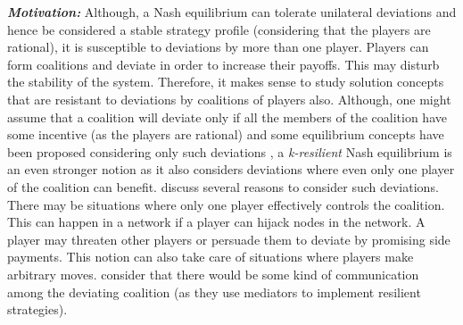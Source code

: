 \textit{\textbf{Motivation:}} Although, a Nash equilibrium can tolerate unilateral deviations and hence be considered a stable strategy profile (considering that the players are rational), it is susceptible to deviations by more than one player. Players can form coalitions and deviate in order to increase their payoffs. This may disturb the stability of the system. Therefore, it makes sense to study solution concepts that are resistant to deviations by coalitions of players also. Although, one might assume that a coalition will deviate only if all the members of the coalition have some incentive (as the players are rational) and some equilibrium concepts have been proposed considering only such deviations \cite{Aumann-59,Bernheim-1987,Moreno-1996}, a \textit{k-resilient} Nash equilibrium is an even stronger notion as it also considers deviations where even only one player of the coalition can benefit. \citet{Abraham-2006} discuss several reasons to consider such deviations. There may be situations where only one player effectively controls the coalition. This can happen in a network if a player can hijack nodes in the network. A player may threaten other players or persuade them to deviate by promising side payments. This notion can also take care of situations where players make arbitrary moves. \citet{Abraham-2006,Abraham-2008} consider that there would be some kind of communication among the deviating coalition (as they use mediators to implement resilient strategies).

